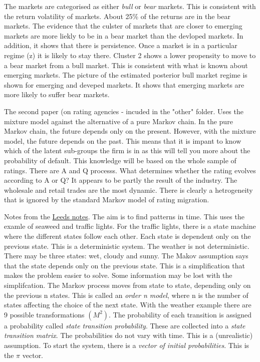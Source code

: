 \documentclass[12pt, a4paper, oneside]{article} %
\begin{document}
The markets are categorised as either \emph{bull} or \emph{bear} markets. This is consistent with the return volatility of markets.  About 25\% of the returns are in the bear markets. The evidence that the culster of markets that are closer to emerging markets are more liekly to be in a bear market than the devloped markets. In addition, it shows that there is persistence.  Once a market is in a particular regime (z) it is likely to stay there. Cluster 2 shows a lower propensity to move to a bear market from a bull market.  This is consistent with what is known about emerging markets.  The picture of the estimated posterior bull market regime is shown for emerging and deveped markets.  It shows that emerging markets are more likely to suffer bear markets.  

The second paper (on rating agencies - incuded in the "other" folder.  Uses the mixture model against the alternative of a pure Markov chain. In the pure Markov chain, the future depends only on the present.  However, with the mixture model, the future depends on the past.  This means that it is impant to know which of the latent sub-groups the firm is in as this will tell you more about the probability of default.  This knowledge will be based on the whole sample of ratings. There are A and Q processs.  What determines whether the rating evolves according to A or Q?  It appears to be partly the result of the industry.  The wholesale and retail trades are the most dynamic. There is clearly a hetrogeneity that is ignored by the standard Markov model of rating migration. 

Notes from the \href{http://www.comp.leeds.ac.uk/roger/HiddenMarkovModels/html_dev/main.html}{Leeds notes}.  The aim is to find patterns in time. This uses the examle of seaweed and traffic lights.  For the traffic lights, there is a state machine where the different states follow each other. Each state is dependent only on the previous state. This is a deterministic system. The weather is not deterministic.  There may be three states:  wet, cloudy and sunny. The Makov assumption says that the state depends only on the previous state. This is a simplification that makes the problem easier to solve.  Some information may be lost with the simplifcation. The Markov process moves from state to state, depending only on the previous n states.  This is called an \emph{order n model}, where n is the number of states affecting the choice of the next state. With the weather example there are 9 possible transformations $(M^2)$.  The probability of each transition is assigned  a probability called \emph{state transition probability}.  These are collected into a \emph{state transition matrix}. The probabilities do not vary with time.  This is a (unrealistic) assumption. To start the system, there is a \emph{vector of initial probabilities}.  This is the $\pi$ vector.  
\end{document}
